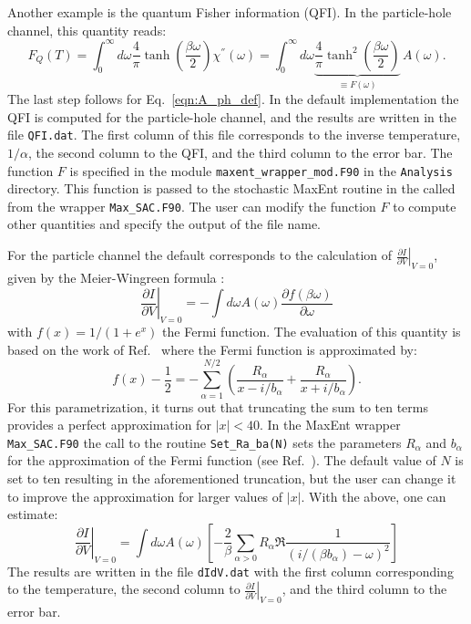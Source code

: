 Another  example is  the  quantum Fisher  information \cite{Hauke16} (QFI).  In the particle-hole channel,  this  quantity  reads: 
\begin{equation}
   F_Q(T) =  \int_{0}^{\infty}   d \omega   \frac{4}{\pi} \tanh\left( \frac{\beta \omega}{2} \right) \chi^{''}(\omega)  = 
             \int_{0}^{\infty}   d \omega  \underbrace{ \frac{4}{\pi} \tanh^2\left( \frac{\beta \omega}{2} \right) }_{\equiv F(\omega) } \, A(\omega).
\end{equation}
The  last  step follows  for  Eq.~\ref{eqn:A_ph_def}.    
In the default implementation  the  QFI is computed for  the particle-hole channel, and  the results are written in the file \texttt{QFI.dat}.  The first column of this file corresponds to the inverse temperature, $1/\alpha$, the second column to the QFI, and the third column to the error bar.  The function $F$ is specified in the module \texttt{maxent\_wrapper\_mod.F90} in the  \texttt{Analysis}   directory.
This function is  passed to the stochastic MaxEnt routine in the called from the wrapper \texttt{Max\_SAC.F90}.  The user can modify the function $F$ to compute other quantities and specify the output of the file name. 

For the particle channel the  default corresponds  to the calculation of  $\left. \frac{\partial I}{\partial V}\right|_{V=0}$, given by  the 
Meier-Wingreen formula \cite{Meir92}:
\begin{equation}
 \left. \frac{\partial I}{\partial V}\right|_{V=0} = - \int d \omega A(\omega) \frac{\partial f(\beta \omega)}{\partial \omega} 
\end{equation}
with $f(x) = 1/(1+e^x)$ the Fermi function.  The  evaluation of this quantity is based on the work of Ref.~\cite{Karrasch10} where the 
Fermi function is approximated by: 
\begin{equation}
  f(x) - \frac{1}{2} = - \sum_{\alpha =1 }^{N/2} \left( \frac{R_\alpha}{x - i/ b_\alpha} + \frac{R_\alpha}{x + i /b_\alpha} \right).
\end{equation} 
For this parametrization, it turns out  that truncating the sum to ten terms provides a perfect approximation  for $|x|<40$.  
In  the MaxEnt wrapper \texttt{Max\_SAC.F90}  the call to the routine \texttt{Set\_Ra\_ba(N)} sets the parameters $R_\alpha$ and $b_\alpha$ for the approximation of the Fermi function (see Ref.~\cite{Karrasch10}).  The default value of $N$ is set to ten  resulting in the aforementioned truncation, but the user can change it to improve the approximation for larger values of $|x|$.   With the above,  one  can estimate:
\begin{equation}
   \left. \frac{\partial I}{\partial V}\right|_{V=0}  = \int d \omega A(\omega) \left[ -\frac{2}{\beta} 
   \sum_{\alpha>0}  R_\alpha \Re \frac{1}{(i/(\beta b_\alpha) - \omega)^2} \right] 
\end{equation}
The results are written in the file \texttt{dIdV.dat} with the first column corresponding to the temperature, the second column to $\left. \frac{\partial I}{\partial V}\right|_{V=0}$, and the third column to the error bar.



